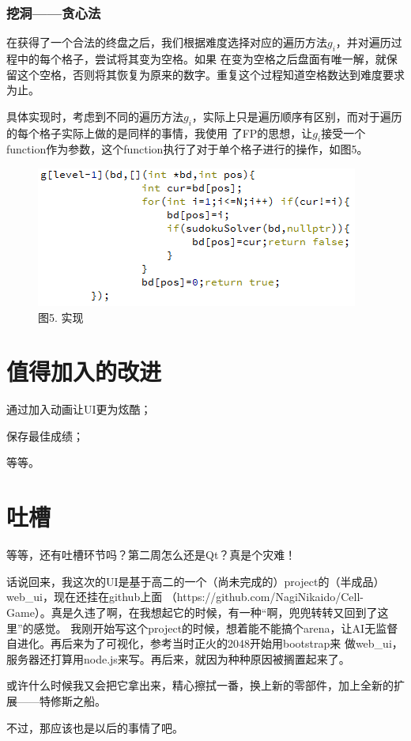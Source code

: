 \documentclass[a4paper,10pt]{article}
\begin{document}
        \subsubsection{挖洞——贪心法}

        在获得了一个合法的终盘之后，我们根据难度选择对应的遍历方法$g_i$，并对遍历过程中的每个格子，尝试将其变为空格。如果
        在变为空格之后盘面有唯一解，就保留这个空格，否则将其恢复为原来的数字。重复这个过程知道空格数达到难度要求为止。

        具体实现时，考虑到不同的遍历方法$g_i$，实际上只是遍历顺序有区别，而对于遍历的每个格子实际上做的是同样的事情，我使用
        了FP的思想，让$g_i$接受一个function作为参数，这个function执行了对于单个格子进行的操作，如图5。

        \begin{figure}
            \centering
            \includegraphics{generator.png}
            \caption{图5. 实现}
        \end{figure}
    \section{值得加入的改进}

    通过加入动画让UI更为炫酷；

    保存最佳成绩；

    等等。

    \section{吐槽}

    等等，还有吐槽环节吗？第二周怎么还是Qt？真是个灾难！

    话说回来，我这次的UI是基于高二的一个（尚未完成的）project的（半成品）web\_ui，现在还挂在github上面
    （https://github.com/NagiNikaido/Cell-Game）。真是久违了啊，在我想起它的时候，有一种“啊，兜兜转转又回到了这里”的感觉。
    我刚开始写这个project的时候，想着能不能搞个arena，让AI无监督自进化。再后来为了可视化，参考当时正火的2048开始用bootstrap来
    做web\_ui，服务器还打算用node.js来写。再后来，就因为种种原因被搁置起来了。

    或许什么时候我又会把它拿出来，精心擦拭一番，换上新的零部件，加上全新的扩展——特修斯之船。

    不过，那应该也是以后的事情了吧。
\end{document}
